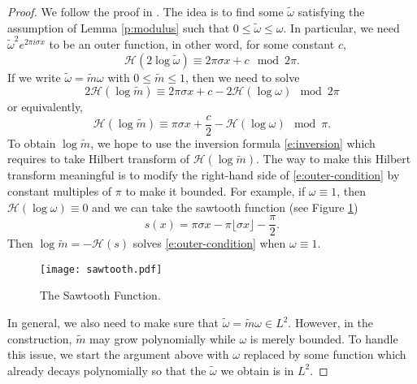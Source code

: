 \documentclass[reqno,12pt,letterpaper]{amsart}
\numberwithin{equation}{section}
\numberwithin{prop}{section}
\begin{document}
\begin{proof}
We follow the proof in \cite{bm7}. The idea is to find some $\widetilde{\omega}$ satisfying the assumption of Lemma \ref{p:modulus} such that $0\leq\widetilde{\omega}\leq\omega$. In particular, we need $\widetilde{\omega}^2e^{2\pi i\sigma x}$ to be an outer function, in other word, for some constant $c$,
\begin{equation*}
\mathcal{H}(2\log\widetilde{\omega})\equiv 2\pi\sigma x+c \mod{2\pi}.
\end{equation*}
If we write $\widetilde{\omega}=\widetilde{m}\omega$ with $0\leq\widetilde{m}\leq1$, then we need to solve
\begin{equation*}
2\mathcal{H}(\log\widetilde{m})\equiv 2\pi\sigma x+c-2\mathcal{H}(\log\omega)
\mod{2\pi}
\end{equation*}
or equivalently,
\begin{equation}
\label{e:outer-condition}
\mathcal{H}(\log\widetilde{m})\equiv \pi\sigma x+\frac{c}{2}-\mathcal{H}(\log\omega)
\mod{\pi}.
\end{equation}
To obtain $\log\widetilde{m}$, we hope to use the inversion formula \eqref{e:inversion} which requires to take Hilbert transform of $\mathcal{H}(\log\widetilde{m})$. The way to make this Hilbert transform meaningful is to modify the right-hand side of \eqref{e:outer-condition} by constant multiples of $\pi$ to make it bounded. For example, if $\omega\equiv1$, then $\mathcal{H}(\log\omega)\equiv0$ and we can take the sawtooth function (see Figure \ref{f:sawtooth})
\begin{equation}
\label{e:sawtooth}
s(x)=\pi\sigma x-\pi\lfloor\sigma x\rfloor-\frac{\pi}{2}.
\end{equation}
Then $\log\widetilde{m}=-\mathcal{H}(s)$ solves \eqref{e:outer-condition} when $\omega\equiv1$.

\begin{figure}
\centering
\texttt{[image: sawtooth.pdf]}
\caption{The Sawtooth Function.}
\label{f:sawtooth}
\end{figure}

In general, we also need to make sure that $\widetilde{\omega}=\widetilde{m}\omega\in L^2$. However, in the construction, $\widetilde{m}$ may grow polynomially while $\omega$ is merely bounded. To handle this issue, we start the argument above with $\omega$ replaced by some function which already decays polynomially so that the $\widetilde{\omega}$ we obtain is in $L^2$.


\end{proof}
\end{document}
